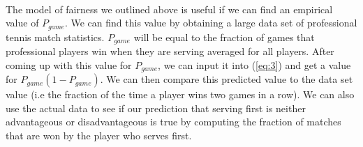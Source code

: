 \documentclass[12pt]{article}
\begin{document}
\paragraph{} The model of fairness we outlined above is useful if we can find an empirical value of $P_{game}$. We can find this value by obtaining a large data set of professional tennis match statistics. $P_{game}$ will be equal to the fraction of games that professional players win when they are serving averaged for all players. After coming up with this value for $P_{game}$, we can input it into (\ref{eq:3}) and get a value for $P_{game}(1-P_{game})$. We can then compare this predicted value to the data set value (i.e the fraction of the time a player wins two games in a row). We can also use the actual data to see if our prediction that serving first is neither advantageous or disadvantageous is true by computing the fraction of matches that are won by the player who serves first. 
 

\end{document}
